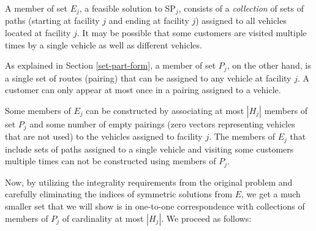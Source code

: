 A member of set $E_j$, a feasible solution to SP$_j$, 
consists of a {\em collection} of sets of paths (starting at facility $j$
and ending at facility $j$) assigned to all vehicles located at 
facility $j$. It may be possible that some customers are visited 
multiple times by a single vehicle as well as different vehicles. 

As explained in Section \ref{set-part-form}, a member of set $P_j$, 
on the other hand, is a single set of routes (pairing) that can be 
assigned to any vehicle at facility $j$. A customer can only appear 
at most once in a pairing assigned to a vehicle.  

Some members of $E_j$ can be constructed by associating at most
$|H_j|$ members of set $P_{j}$ and some number of empty pairings (zero
vectors representing vehicles that are not used) to the vehicles
assigned to facility $j$. The members of $E_j$ that  include sets of 
paths assigned to a single vehicle and visiting some customers multiple times
can not be constructed using members of $P_{j}$. 

Now, by utilizing the integrality requirements from the original
problem and carefully eliminating the indices of symmetric solutions
from $E$, we get a much smaller set that we will show is in one-to-one
correspondence with collections of members of $P_j$ of cardinality at
most $|H_j|$. We proceed as follows:


